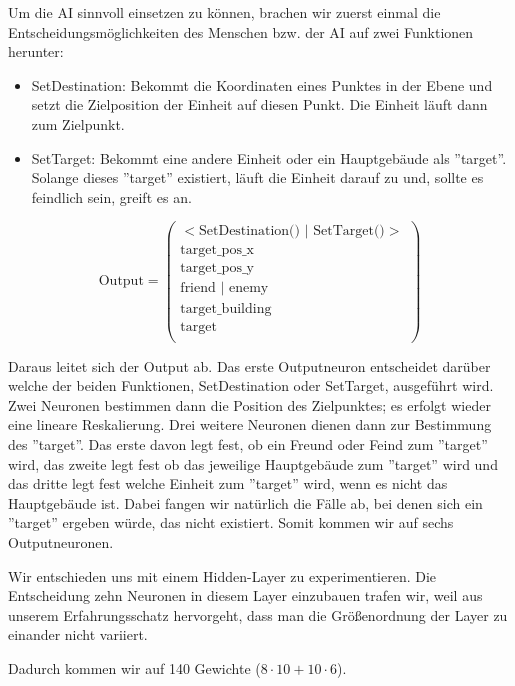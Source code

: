 \documentclass[
	12pt,
	a4paper,
	BCOR10mm,
	DIV14,
	headsepline,
	usegeometry,
]{scrreprt}
\begin{document}
Um die AI sinnvoll einsetzen zu können, brachen wir zuerst einmal die Entscheidungsmöglichkeiten des Menschen bzw. der AI auf zwei Funktionen herunter: 

\begin{itemize}
	\item SetDestination: Bekommt die Koordinaten eines Punktes in der Ebene und setzt die Zielposition der Einheit auf diesen Punkt.
Die Einheit läuft dann zum Zielpunkt.
	\item SetTarget: Bekommt eine andere Einheit oder ein Hauptgebäude als ''target''.
Solange dieses ''target'' existiert, läuft die Einheit darauf zu und, sollte es feindlich sein, greift es an.
\end{itemize}

\begin{equation}
	\text{Output} = \left( \begin{matrix}
		<\text{SetDestination() | SetTarget()}> \\
		\text{target\_pos\_x} \\
		\text{target\_pos\_y} \\
		\text{friend | enemy} \\
		\text{target\_building} \\
		\text{target} \\
	\end{matrix} \right)
\end{equation}

Daraus leitet sich der Output ab.
Das erste Outputneuron entscheidet darüber welche der beiden Funktionen, SetDestination oder SetTarget, ausgeführt wird.
Zwei Neuronen bestimmen dann die Position des Zielpunktes; es erfolgt wieder eine lineare Reskalierung.
Drei weitere Neuronen dienen dann zur Bestimmung des ''target''.
Das erste davon legt fest, ob ein Freund oder Feind zum ''target'' wird, das zweite legt fest ob das jeweilige Hauptgebäude zum ''target'' wird und das dritte legt fest welche Einheit zum ''target'' wird, wenn es nicht das Hauptgebäude ist.
Dabei fangen wir natürlich die Fälle ab, bei denen sich ein ''target'' ergeben würde, das nicht existiert.
Somit kommen wir auf sechs Outputneuronen.

Wir entschieden uns mit einem Hidden-Layer zu experimentieren.
Die Entscheidung zehn Neuronen in diesem Layer einzubauen trafen wir, weil aus unserem Erfahrungsschatz hervorgeht, dass man die Größenordnung der Layer zu einander nicht variiert.

Dadurch kommen wir auf 140 Gewichte ($8 \cdot 10 + 10 \cdot 6$).
\end{document}
